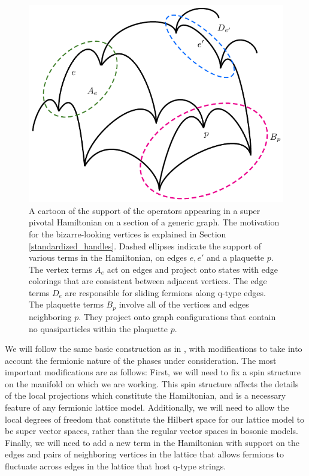\documentclass[12pt,a4paper]{article}
\begin{document}
 \begin{figure}
\begin{center}
  \includegraphics{sample_lattice.pdf}
 \caption{A cartoon of the support of the operators appearing in a super pivotal Hamiltonian on a section of a generic graph. 
The motivation for the bizarre-looking vertices is explained in Section \ref{standardized_handles}.
Dashed ellipses indicate the support of various terms in the Hamiltonian, on edges $e,e'$ and a plaquette $p$.
The vertex terms $A_e$ act on edges and project onto states with edge colorings that are consistent between adjacent vertices. 
The edge terms $D_e$ are responsible for sliding fermions along q-type edges. 
The plaquette terms $B_p$ involve all of the vertices and edges neighboring $p$.
They project onto graph configurations that contain no quasiparticles within the plaquette $p$.}
 \label{example_lattice}
 \end{center}
 \end{figure}

We will follow the same basic construction as in \cite{levin2005}, with modifications to take into account 
the fermionic nature of the phases under consideration. 
The most important modifications are as follows:
First, we will need to fix a spin structure on the manifold on which we are working.
This spin structure affects the details of the local projections which constitute the Hamiltonian, and is a necessary feature of any fermionic lattice model.
Additionally, we will need to allow the local degrees of freedom that constitute the 
Hilbert space for our lattice model to be super vector spaces, rather than the regular vector spaces in bosonic models. 
Finally, we will need to add a new term in the Hamiltonian with support on the edges and pairs of neighboring vertices in the lattice that allows fermions to fluctuate across edges in the lattice that host q-type strings.%
\end{document}
